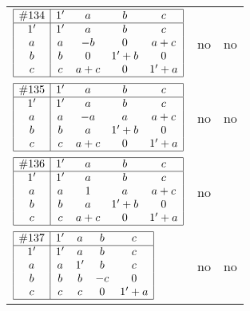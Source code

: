 \documentclass[12pt]{article}
\theoremstyle{definition}
\newcommand{\join}{\mathbin{+}}%
\newcommand{\id}{{1'}}%
\renewcommand{\top}{1}%
\begin{document}
\begin{center}
\begin{longtable}{l|c|c}
$
\begin{array}{|c|cccc|} \hline
\#134 & \id & a & b & c \\ \hline
\id & \id & a & b & c \\
a & a & -b & 0 & a \join c \\
b & b & 0 & \id \join b & 0 \\
c & c & a \join c & 0 & \id \join a \\ \hline
\end{array}
$
 & no  
 & no      \\[15mm]

$
\begin{array}{|c|cccc|} \hline
\#135 & \id & a & b & c \\ \hline
\id & \id & a & b & c \\
a & a & -a & a & a \join c \\
b & b & a & \id \join b & 0 \\
c & c & a \join c & 0 & \id \join a \\ \hline
\end{array}
$
 & no  
 & no      \\[15mm]

$
\begin{array}{|c|cccc|} \hline
\#136 & \id & a & b & c \\ \hline
\id & \id & a & b & c \\
a & a & \top & a & a \join c \\
b & b & a & \id \join b & 0 \\
c & c & a \join c & 0 & \id \join a \\ \hline
\end{array}
$
 & no  
 & \adjustbox{valign=c, max height=1.6cm}{$
\left[ \begin{array}{cccccc}
\id & a & b & a & a & b \\ 
a & \id & a & c & a & a \\ 
b & a & \id & a & a & b \\ 
a & c & a & \id & c & a \\ 
a & a & a & c & \id & a \\ 
b & a & b & a & a & \id
\end{array}\right]
$}      \\[15mm]

$
\begin{array}{|c|cccc|} \hline
\#137 & \id & a & b & c \\ \hline
\id & \id & a & b & c \\
a & a & \id & b & c \\
b & b & b & -c & 0 \\
c & c & c & 0 & \id \join a \\ \hline
\end{array}
$
 & no  
 & no      \\[15mm]


\end{longtable}
\end{center}
\end{document}

